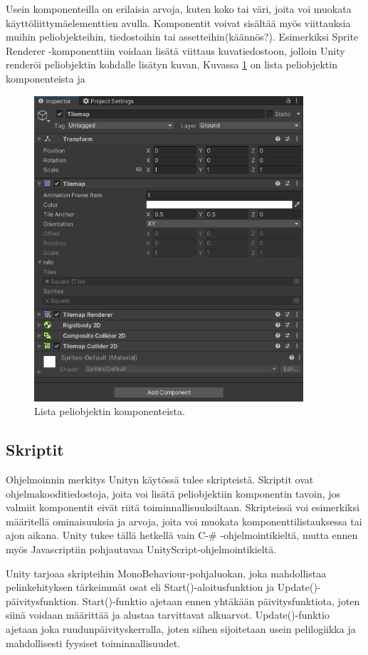\documentclass[utf8]{gradu3}
\begin{document}
Usein komponenteilla on erilaisia arvoja, kuten koko tai väri, joita voi muokata käyttöliittymäelementtien avulla. Komponentit voivat sisältää myös viittauksia muihin peliobjekteihin, tiedostoihin tai assetteihin(käännös?). Esimerkiksi Sprite Renderer -komponenttiin voidaan lisätä viittaus kuvatiedostoon, jolloin Unity renderöi peliobjektin kohdalle lisätyn kuvan. Kuvassa \ref{komponenttikuva} on lista peliobjektin komponenteista ja 

\begin{figure}[t]
\centering
\includegraphics[width=10cm]{komponenttilistaus.png}
\caption{Lista peliobjektin komponenteista.}
\label{komponenttikuva}
\end{figure}

\subsection{Skriptit}

Ohjelmoinnin merkitys Unityn käytössä tulee skripteistä. Skriptit ovat ohjelmakooditiedostoja, joita voi lisätä peliobjektiin komponentin tavoin, jos valmiit komponentit eivät riitä toiminnallisuuksiltaan. Skripteissä voi esimerkiksi määritellä ominaisuuksia ja arvoja, joita voi muokata komponenttilistauksessa tai ajon aikana. Unity tukee tällä hetkellä vain C-\# -ohjelmointikieltä, mutta ennen myös Javascriptiin pohjautuvaa UnityScript-ohjelmointikieltä.

Unity tarjoaa skripteihin MonoBehaviour-pohjaluokan, joka mahdollistaa pelinkehityksen tärkeimmät osat eli Start()-aloitusfunktion ja Update()-päivitysfunktion. Start()-funktio ajetaan ennen yhtäkään päivitysfunktiota, joten siinä voidaan määrittää ja alustaa tarvittavat alkuarvot. Update()-funktio ajetaan joka ruudunpäivityskerralla, joten siihen sijoitetaan usein pelilogiikka ja mahdollisesti fyysiset toiminnallisuudet.
\end{document}
